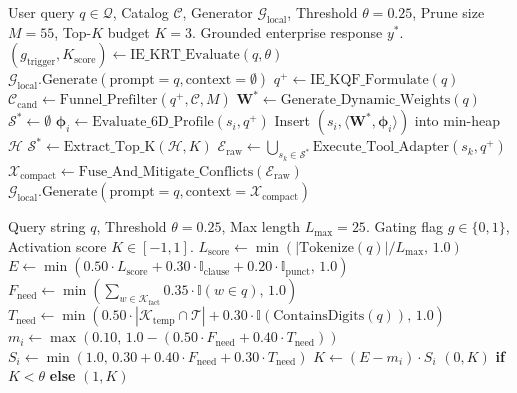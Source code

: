 \documentclass[journal,10pt,twocolumn]{IEEEtran}
\begin{document}
\begin{algorithm}[h]
\caption{End-to-End AMORA Master Execution Pipeline}
\label{alg:end_to_end}
\begin{algorithmic}[1]
\REQUIRE User query $q \in \mathcal{Q}$, Catalog $\mathcal{C}$, Generator $\mathcal{G}_{\text{local}}$, Threshold $\theta = 0.25$, Prune size $M = 55$, Top-$K$ budget $K = 3$.
\ENSURE Grounded enterprise response $y^*$.
\STATE $(g_{\text{trigger}}, K_{\text{score}}) \leftarrow \text{IE\_KRT\_Evaluate}(q, \theta)$
    \STATE {}
    \RETURN $\mathcal{G}_{\text{local}}.\text{Generate}(\text{prompt} = q, \text{context} = \emptyset)$
\ENDIF
\STATE $q^+ \leftarrow \text{IE\_KQF\_Formulate}(q)$
\STATE $\mathcal{C}_{\text{cand}} \leftarrow \text{Funnel\_Prefilter}(q^+, \mathcal{C}, M)$ 
\STATE $\mathbf{W}^* \leftarrow \text{Generate\_Dynamic\_Weights}(q)$ 
\STATE $\mathcal{S}^* \leftarrow \emptyset$
    \STATE $\boldsymbol{\phi}_i \leftarrow \text{Evaluate\_6D\_Profile}(s_i, q^+)$
    \STATE Insert $(s_i, \langle \mathbf{W}^*, \boldsymbol{\phi}_i \rangle)$ into min-heap $\mathcal{H}$
\ENDFOR
\STATE $\mathcal{S}^* \leftarrow \text{Extract\_Top\_K}(\mathcal{H}, K)$
\STATE $\mathcal{E}_{\text{raw}} \leftarrow \bigcup_{s_k \in \mathcal{S}^*} \text{Execute\_Tool\_Adapter}(s_k, q^+)$
\STATE $\mathcal{X}_{\text{compact}} \leftarrow \text{Fuse\_And\_Mitigate\_Conflicts}(\mathcal{E}_{\text{raw}})$
\RETURN $\mathcal{G}_{\text{local}}.\text{Generate}(\text{prompt} = q, \text{context} = \mathcal{X}_{\text{compact}})$
\end{algorithmic}
\end{algorithm}

\begin{algorithm}[h]
\caption{INKER Knowledge Retrieval Trigger (IE-KRT)}
\label{alg:krt}
\begin{algorithmic}[1]
\REQUIRE Query string $q$, Threshold $\theta = 0.25$, Max length $L_{\text{max}} = 25$.
\ENSURE Gating flag $g \in \{0, 1\}$, Activation score $K \in [-1, 1]$.
\STATE $L_{\text{score}} \leftarrow \min(|\text{Tokenize}(q)| / L_{\text{max}}, \, 1.0)$
\STATE $E \leftarrow \min(0.50 \cdot L_{\text{score}} + 0.30 \cdot \mathbb{I}_{\text{clause}} + 0.20 \cdot \mathbb{I}_{\text{punct}}, \, 1.0)$
\STATE $F_{\text{need}} \leftarrow \min(\sum_{w \in \mathcal{K}_{\text{fact}}} 0.35 \cdot \mathbb{I}(w \in q), \, 1.0)$
\STATE $T_{\text{need}} \leftarrow \min(0.50 \cdot |\mathcal{K}_{\text{temp}} \cap \mathcal{T}| + 0.30 \cdot \mathbb{I}(\text{ContainsDigits}(q)), \, 1.0)$
\STATE $m_i \leftarrow \max(0.10, \, 1.0 - (0.50 \cdot F_{\text{need}} + 0.40 \cdot T_{\text{need}}))$
\STATE $S_i \leftarrow \min(1.0, \, 0.30 + 0.40 \cdot F_{\text{need}} + 0.30 \cdot T_{\text{need}})$
\STATE $K \leftarrow (E - m_i) \cdot S_i$
\RETURN $(0, K)$ \textbf{if} $K < \theta$ \textbf{else} $(1, K)$
\end{algorithmic}
\end{algorithm}
\end{document}
